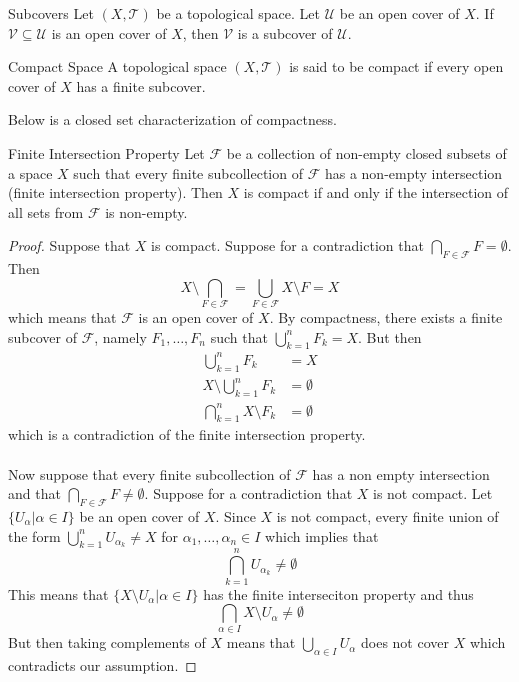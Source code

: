 \begin{defn}{Subcovers}{} Let $(X,\mathcal{T})$ be a topological space. Let $\mathcal{U}$ be an open cover of $X$. If $\mathcal{V}\subseteq\mathcal{U}$ is an open cover of $X$, then $\mathcal{V}$ is a subcover of $\mathcal{U}$. 
\end{defn}

\begin{defn}{Compact Space}{} A topological space $(X,\mathcal{T})$ is said to be compact if every open cover of $X$ has a finite subcover. 
\end{defn}

Below is a closed set characterization of compactness. 

\begin{thm}{Finite Intersection Property}{} Let $\mathcal{F}$ be a collection of non-empty closed subsets of a space $X$ such that every finite subcollection of $\mathcal{F}$ has a non-empty intersection (finite intersection property). Then $X$ is compact if and only if the intersection of all sets from $\mathcal{F}$ is non-empty. \tcbline
\begin{proof}
Suppose that $X$ is compact. Suppose for a contradiction that $\bigcap_{F\in\mathcal{F}}F=\emptyset$. Then $$X\setminus\bigcap_{F\in\mathcal{F}}=\bigcup_{F\in\mathcal{F}}X\setminus F=X$$ which means that $\mathcal{F}$ is an open cover of $X$. By compactness, there exists a finite subcover of $\mathcal{F}$, namely $F_1,\dots, F_n$ such that $\bigcup_{k=1}^nF_k=X$. But then 
\begin{align*}
\bigcup_{k=1}^nF_k&=X\\
X\setminus\bigcup_{k=1}^nF_k&=\emptyset\\
\bigcap_{k=1}^nX\setminus F_k&=\emptyset
\end{align*}
which is a contradiction of the finite intersection property. \\~\\
Now suppose that every finite subcollection of $\mathcal{F}$ has a non empty intersection and that $\bigcap_{F\in\mathcal{F}}F\neq\emptyset$. Suppose for a contradiction that $X$ is not compact. Let $\{U_\alpha|\alpha\in I\}$ be an open cover of $X$. Since $X$ is not compact, every finite union of the form $\bigcup_{k=1}^nU_{\alpha_k}\neq X$ for $\alpha_1,\dots,\alpha_n\in I$ which implies that $$\bigcap_{k=1}^nU_{\alpha_k}\neq\emptyset$$ This means that $\{X\setminus U_\alpha|\alpha\in I\}$ has the finite interseciton property and thus $$\bigcap_{\alpha\in I}X\setminus U_\alpha\neq\emptyset$$ But then taking complements of $X$ means that $\bigcup_{\alpha\in I}U_\alpha$ does not cover $X$ which contradicts our assumption. 
\end{proof}
\end{thm}

